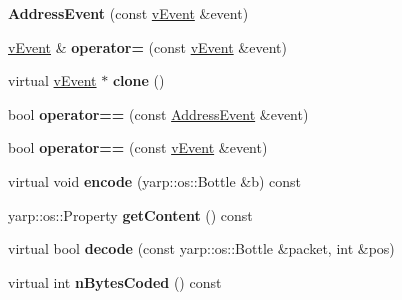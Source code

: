 \begin{DoxyCompactItemize}
\item 
\hypertarget{classemorph_1_1AddressEvent_a2d66de1ff1337f85dbeea02a8dd3593a}{{\bfseries Address\-Event} (const \hyperlink{classemorph_1_1vEvent}{v\-Event} \&event)}\label{classemorph_1_1AddressEvent_a2d66de1ff1337f85dbeea02a8dd3593a}

\item 
\hypertarget{classemorph_1_1AddressEvent_a60eaa995ddad3ee214374c9d85fe504b}{\hyperlink{classemorph_1_1vEvent}{v\-Event} \& {\bfseries operator=} (const \hyperlink{classemorph_1_1vEvent}{v\-Event} \&event)}\label{classemorph_1_1AddressEvent_a60eaa995ddad3ee214374c9d85fe504b}

\item 
\hypertarget{classemorph_1_1AddressEvent_a667127ea5d12dca95037dc1763998b95}{virtual \hyperlink{classemorph_1_1vEvent}{v\-Event} $\ast$ {\bfseries clone} ()}\label{classemorph_1_1AddressEvent_a667127ea5d12dca95037dc1763998b95}

\item 
\hypertarget{classemorph_1_1AddressEvent_a6fc6fbf9415b4551eee250a843f64312}{bool {\bfseries operator==} (const \hyperlink{classemorph_1_1AddressEvent}{Address\-Event} \&event)}\label{classemorph_1_1AddressEvent_a6fc6fbf9415b4551eee250a843f64312}

\item 
\hypertarget{classemorph_1_1AddressEvent_a2bd2c1efef5bdb293577886d1c84da16}{bool {\bfseries operator==} (const \hyperlink{classemorph_1_1vEvent}{v\-Event} \&event)}\label{classemorph_1_1AddressEvent_a2bd2c1efef5bdb293577886d1c84da16}

\item 
\hypertarget{classemorph_1_1AddressEvent_aa8e6e3a1eade9d3607c24dfcce5612b1}{virtual void {\bfseries encode} (yarp\-::os\-::\-Bottle \&b) const }\label{classemorph_1_1AddressEvent_aa8e6e3a1eade9d3607c24dfcce5612b1}

\item 
\hypertarget{classemorph_1_1AddressEvent_a275846fcc224290de0f3bbb567ced038}{yarp\-::os\-::\-Property {\bfseries get\-Content} () const }\label{classemorph_1_1AddressEvent_a275846fcc224290de0f3bbb567ced038}

\item 
\hypertarget{classemorph_1_1AddressEvent_aa725d514b1f3f7ae5609ec2f5b240520}{virtual bool {\bfseries decode} (const yarp\-::os\-::\-Bottle \&packet, int \&pos)}\label{classemorph_1_1AddressEvent_aa725d514b1f3f7ae5609ec2f5b240520}

\item 
\hypertarget{classemorph_1_1AddressEvent_ac7957d7d29a2290d9b572c088a9995dd}{virtual int {\bfseries n\-Bytes\-Coded} () const }\label{classemorph_1_1AddressEvent_ac7957d7d29a2290d9b572c088a9995dd}

\end{DoxyCompactItemize}
